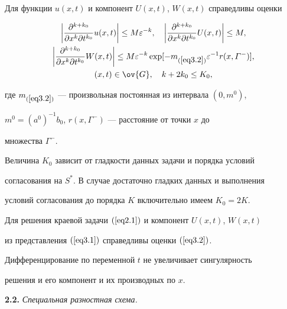 Для функции $u(x,t)$ и компонент $U(x,t)$, $W(x,t)$ справедливы оценки


\begin{gather}


\label{eq3.2}


\bigg|\dx u(x,t)\bigg| \le M\eps^{-k}, \quad


\bigg|\dx U(x,t)\bigg| \le M, \\


\bigg|\dx W(x,t)\bigg| \le M\eps^{-k}\exp[-m_{(\ref{eq3.2})}\eps^{-1}


r(x,\varGamma^{-})],\notag\\


(x,t)\in\ov{G},\quad k+2k_0\le K_0,\notag


\end{gather}


где $m_{(\ref{eq3.2})}$ --- произвольная постоянная из интервала $(0,m^0)$,


$m^0=(a^0)^{-1}b_0$, $r(x,\varGamma^-)$ --- расстояние от точки $x$ до


множества $\varGamma^-$.


Величина $K_0$ зависит от гладкости данных задачи и порядка условий


согласования на $S^*$. В случае достаточно гладких данных и выполнения


условий согласования до порядка $K$ включительно имеем $K_0=2K$.





\begin{thms}


Для решения краевой задачи $(\ref{eq2.1})$ и компонент $U(x,t)$, $W(x,t)$


из представления $(\ref{eq3.1})$ справедливы оценки $(\ref{eq3.2})$.


\end{thms}





\begin{notenonum}


Дифференцирование по переменной $t$ не увеличивает сингулярность


решения и его компонент и их производных по $x$.


\end{notenonum}





{\bf 2.2.} {\it Специальная разностная схема.}



